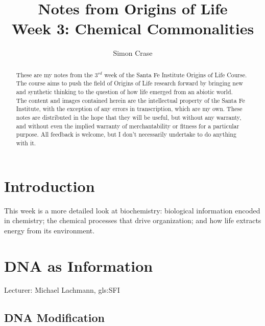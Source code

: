 \documentclass[]{article}
\title{
	Notes from Origins of Life\\
	Week 3: Chemical Commonalities
}
\author{Simon Crase}
\begin{document}
\maketitle

\begin{abstract}
 	These are my notes from the $3^{rd}$ week of the Santa Fe Institute Origins of Life Course\cite{sfi2019}. The course aims to push the field of Origins of Life research forward by bringing new and synthetic thinking to the question of how life emerged from an abiotic world.\\
  	The content and images contained herein are the intellectual property of the Santa Fe Institute, with the exception of any errors in transcription, which are my own.
  	These notes are distributed in the hope that they will be useful,
  	but without any warranty, and without even the implied warranty of
  	merchantability or fitness for a particular purpose. All feedback is welcome,
  	but I don't necessarily undertake to do anything with it.
\end{abstract}

\setcounter{tocdepth}{2}
\tableofcontents

\listoffigures

\section{Introduction}

This week is a more detailed look at biochemistry: biological information encoded in chemistry; the chemical processes that drive organization; and how life extracts energy from its environment.

\section{DNA as Information}
Lecturer: Michael Lachmann, \gls{gls:SFI}

\subsection{DNA Modification}
\end{document}
